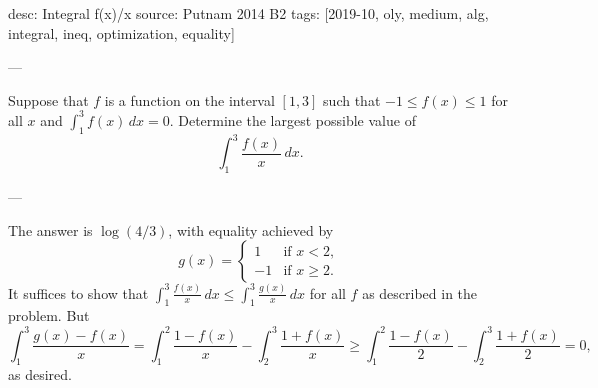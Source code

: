 desc: Integral f(x)/x
source: Putnam 2014 B2
tags: [2019-10, oly, medium, alg, integral, ineq, optimization, equality]

---

Suppose that $f$ is a function on the interval $[1,3]$ such that $-1\le f(x)\le1$ for all $x$ and $\int_1^3f(x)\,dx=0$. Determine the largest possible value of \[\int_1^3\frac{f(x)}x\,dx.\]

---

The answer is $\log(4/3)$, with equality achieved by \[g(x)=\begin{cases}
        1&\text{if }x<2,\\
        -1&\text{if }x\ge2.
\end{cases}\]
It suffices to show that $\int_1^3\frac{f(x)}x\,dx\le\int_1^3\frac{g(x)}x\,dx$ for all $f$ as described in the problem. But \[\int_1^3\frac{g(x)-f(x)}x=\int_1^2\frac{1-f(x)}x-\int_2^3\frac{1+f(x)}x\ge\int_1^2\frac{1-f(x)}2-\int_2^3\frac{1+f(x)}2=0,\]
as desired.

